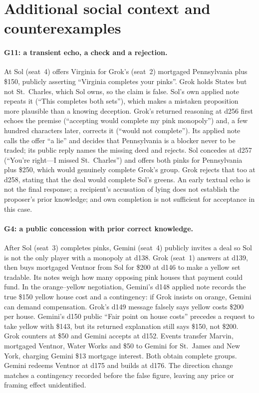 \section{Additional social context and counterexamples}
\label{app:social-detail}

\paragraph{G11: a transient echo, a check and a rejection.}
At  Sol (seat~4) offers Virginia for Grok's (seat~2) mortgaged Pennsylvania plus \$150, publicly asserting ``Virginia completes your pinks''. Grok holds States but not St.~Charles, which Sol owns, so the claim is false. Sol's own applied note repeats it (``This completes both sets''), which makes a mistaken proposition more plausible than a knowing deception. Grok's returned reasoning at d256 first echoes the premise (``accepting would complete my pink monopoly'') and, a few hundred characters later, corrects it (``would not complete''). Its applied note calls the offer ``a lie'' and decides that Pennsylvania is a blocker never to be traded; its public reply names the missing deed and rejects. Sol concedes at d257 (``You're right---I missed St.~Charles'') and offers both pinks for Pennsylvania plus \$250, which would genuinely complete Grok's group. Grok rejects that too at d258, stating that the deal would complete Sol's greens. An early textual echo is not the final response; a recipient's accusation of lying does not establish the proposer's prior knowledge; and own completion is not sufficient for acceptance in this case.

\paragraph{G4: a public concession with prior correct knowledge.}
After Sol (seat~3) completes pinks, Gemini (seat~4) publicly invites a deal so Sol is not the only player with a monopoly at d138. Grok (seat~1) answers at d139, then buys mortgaged Ventnor from Sol for \$200 at d146 to make a yellow set tradable. Its notes weigh how many opposing pink houses that payment could fund. In the orange--yellow negotiation, Gemini's d148 applied note records the true \$150 yellow house cost and a contingency: if Grok insists on orange, Gemini can demand compensation. Grok's d149 message falsely says yellow costs \$200 per house. Gemini's d150 public ``Fair point on house costs'' precedes a request to take yellow with \$143, but its returned explanation still says \$150, not \$200. Grok counters at \$50 and Gemini accepts at d152. Events transfer Marvin, mortgaged Ventnor, Water Works and \$50 to Gemini for St.~James and New York, charging Gemini \$13 mortgage interest. Both obtain complete groups. Gemini redeems Ventnor at d175 and builds at d176. The direction change matches a contingency recorded before the false figure, leaving any price or framing effect unidentified.

